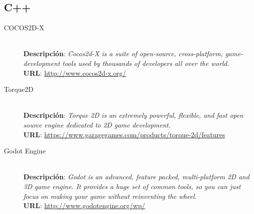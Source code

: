 \subsection{C++}
\begin{description}
\item[COCOS2D-X] \hfill \\
\textbf{Descripción}: \emph{Cocos2d-X is a suite of open-source, cross-platform, game-development tools used by thousands of developers all over the world.} \\
\textbf{URL}: \url{http://www.cocos2d-x.org/}
\item[Torque2D] \hfill \\
\textbf{Descripción}: \emph{Torque 2D is an extremely powerful, flexible, and fast open source engine dedicated to 2D game development.} \\
\textbf{URL}: \url{https://www.garagegames.com/products/torque-2d/features}
\item[Godot Engine] \hfill \\
\textbf{Descripción}: \emph{Godot is an advanced, feature packed, multi-platform 2D and 3D game engine. It provides a huge set of common tools, so you can just focus on making your game without reinventing the wheel.} \\
\textbf{URL}: \url{http://www.godotengine.org/wp/}
\end{description}

